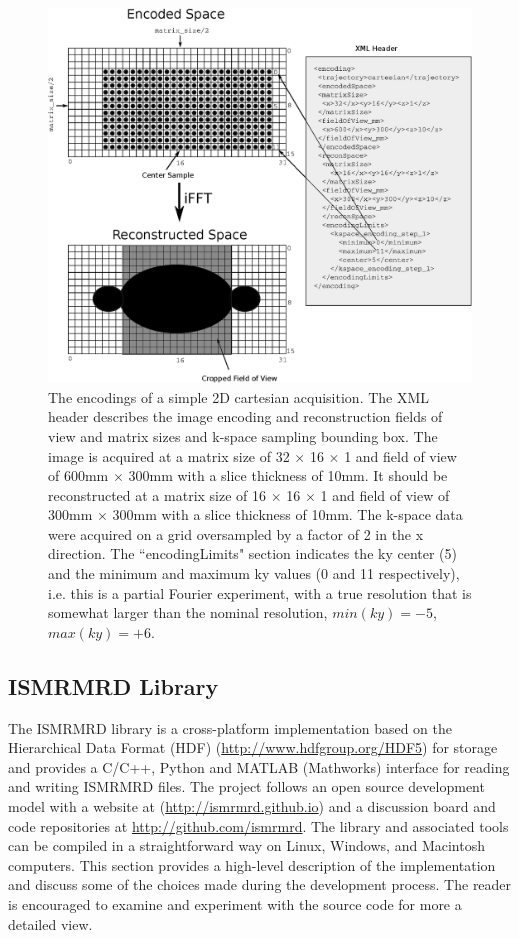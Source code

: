 \documentclass[12pt]{article}
\begin{document}
\begin{figure}
\begin{center}
\includegraphics[width=6in]{figure3_encoding_spaces.eps}
\caption{The encodings of a simple 2D cartesian acquisition.  The XML header describes the image encoding and reconstruction fields of view and matrix sizes and k-space sampling bounding box.  The image is acquired at a matrix size of 32 $\times$ 16 $\times$ 1 and field of view of 600mm $\times$ 300mm with a slice thickness of 10mm.  It should be reconstructed at a matrix size of 16 $\times$ 16 $\times$ 1 and field of view of 300mm $\times$ 300mm with a slice thickness of 10mm.   The k-space data were acquired on a grid oversampled by a factor of 2 in the x direction.  The ``encodingLimits" section indicates the ky center (5) and the minimum and maximum ky values (0 and 11 respectively), i.e. this is a partial Fourier experiment, with a true resolution that is somewhat larger than the nominal resolution, $min(ky)=-5$, $max(ky)=+6$.}
\label{fig:encoding}
\end{center}
\end{figure}


\subsection*{ISMRMRD Library}
The ISMRMRD library is a cross-platform implementation based on the Hierarchical Data Format (HDF) (\url{http://www.hdfgroup.org/HDF5}) for storage and provides a C/C++, Python and MATLAB (Mathworks) interface for reading and writing ISMRMRD files.  The project follows an open source development model with a website at (\url{http://ismrmrd.github.io}) and a discussion board and code repositories at \url{http://github.com/ismrmrd}.  The library and associated tools can be compiled in a straightforward way on Linux, Windows, and Macintosh computers.  This section provides a high-level description of the implementation and discuss some of the choices made during the development process.  The reader is encouraged to examine and experiment with the source code for more a detailed view.
\end{document}
